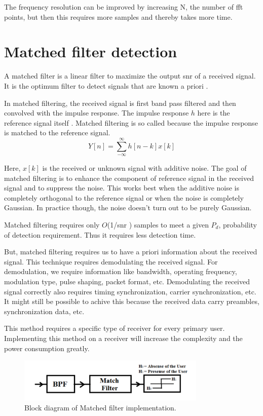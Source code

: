 The frequency resolution can be improved by increasing N, the number of \gls{fft}  
points, but then this requires more samples and thereby takes more time.

\section{Matched filter detection}
A matched filter is a linear filter to maximize the output \gls{snr}  of a received 
signal. It is the optimum filter to detect signals that are known a priori 
\cite{wikiMF}.


In matched filtering, the received signal is first band pass filtered and then
convolved with the impulse response. The impulse response $h$ here is the 
reference signal itself \cite{bhatta11}. Matched filtering is so called 
because the impulse response is matched to the reference signal.
\begin{equation*}
    Y[n] = \sum_{-\infty}^{\infty} h[n-k]x[k]
\end{equation*}

Here, $x[k]$ is the received or unknown signal with additive noise.
The goal of matched filtering is to enhance the component of reference signal
in the received signal and to suppress the noise. This works best when the 
additive noise is completely orthogonal to the reference signal or when the
noise is completely Gaussian. In practice though, the noise doesn't turn out 
to be purely Gaussian.
 
Matched filtering requires only $O$(1/\gls{snr} ) samples to meet a given $P_d$, 
probability of detection requirement. Thus it requires less detection time.

But, matched filtering requires us to have a priori information about the 
received signal. This technique requires demodulating the received signal. For
demodulation, we require information like bandwidth, operating frequency, 
modulation type, pulse shaping, packet format, etc. Demodulating the received
signal correctly also requires timing synchronization, carrier 
synchronization, etc. It might still be possible to achive this because the
received data carry preambles, synchronization data, etc.

This method requires a specific type of receiver for every primary user.
Implementing this method on a receiver will increase the complexity and the 
power consumption greatly.

\begin{figure}
\centering
\includegraphics[width=0.8\textwidth]{../images/matchedFilter}
\caption[Matched filter]{Block diagram of Matched filter implementation.}
\label{matchedFilter}
\end{figure}


